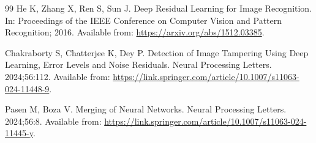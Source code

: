 \documentclass[pdflatex,sn-basic,Numbered]{sn-jnl}
\begin{document}
\begin{thebibliography}{99}
He K, Zhang X, Ren S, Sun J. Deep Residual Learning for Image Recognition. In: Proceedings of the IEEE Conference on Computer Vision and Pattern Recognition; 2016. Available from: \url{https://arxiv.org/abs/1512.03385}.

Chakraborty S, Chatterjee K, Dey P. Detection of Image Tampering Using Deep Learning, Error Levels and Noise Residuals. Neural Processing Letters. 2024;56:112. Available from: \url{https://link.springer.com/article/10.1007/s11063-024-11448-9}.

Pasen M, Boza V. Merging of Neural Networks. Neural Processing Letters. 2024;56:8. Available from: \url{https://link.springer.com/article/10.1007/s11063-024-11445-y}.

\end{thebibliography}
\end{document}
